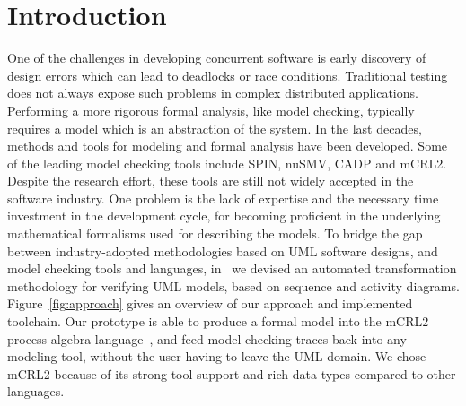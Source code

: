 \documentclass[letter]{llncs}
\begin{document}
\section{Introduction}
\label{sec:Introduction}
One of the challenges in developing concurrent software is early discovery of design errors which can lead to deadlocks or race conditions.
Traditional testing does not always expose such problems in complex distributed applications. Performing a more rigorous formal analysis, like model checking, 
typically requires a model which is an abstraction of the system.
In the last decades, methods and tools
for modeling and formal analysis have been developed. Some of the leading model checking tools include SPIN, nuSMV, CADP and mCRL2. 
Despite the research effort, these tools are still not widely accepted in the software industry. One problem is the lack of expertise and
the necessary time investment in the development cycle, for becoming proficient in
the underlying mathematical formalisms used for describing the models. 
To bridge the gap between industry-adopted methodologies based on UML software
designs, and model checking tools and languages, in~\cite{DBLP:dblp_conf/nfm/RemenskaTWHVCB13} we devised 
an automated transformation methodology for verifying UML
models, based on sequence and activity diagrams. Figure~\ref{fig:approach} gives an overview of our approach and implemented toolchain. 
Our prototype is able to produce
a formal model into the mCRL2 process algebra language~\cite{FormalLanguagemCRL2}, and feed model checking traces back into any modeling
tool, without the user having to leave the UML domain. 
We chose mCRL2 because of its strong tool support and rich data types compared to other languages.
\end{document}
